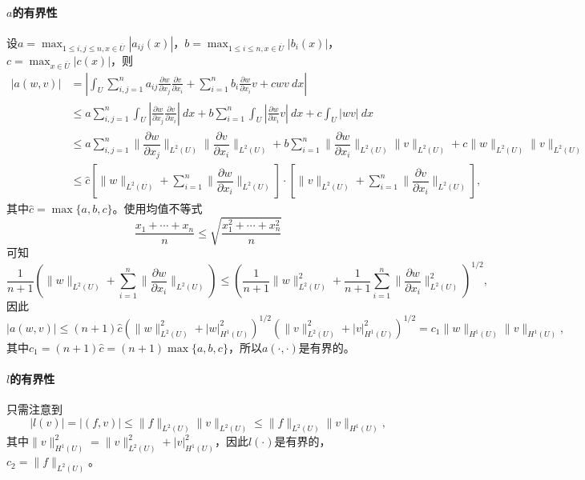 \documentclass[a4paper,10pt]{ctexart}
\begin{document}
\paragraph*{$ a $的有界性}
设$ a = \max_{1\leqslant i,j\leqslant n,x\in \overline{U}} |a_{ij}(x)| $，$ b = \max_{1\leqslant i\leqslant n,x\in \overline{U}} |b_i(x)| $，$ c = \max_{x\in \overline{U}} |c(x)| $，则
\[
    \begin{aligned}
        |a(w,v) |
        &= \left| \int_U \sum_{i,j=1}^n a_{ij}\frac{\partial w}{\partial x_j}\frac{\partial v}{\partial x_i} + \sum_{i=1}^n b_i\frac{\partial w}{\partial x_i}v + cwv\ d x \right|\\
        &\leqslant a \sum_{i,j=1}^n \int_U \left|\frac{\partial w}{\partial x_j}\frac{\partial v}{\partial x_i} \right|\ dx + b \sum_{i=1}^n \int_U \left| \frac{\partial w}{\partial x_i}v \right|\ dx + c \int_U \left| wv \right|\ dx\\
        &\leqslant a \sum_{i,j=1}^n \| \dfrac{\partial w}{\partial x_j} \|_{L^2(U)} \| \dfrac{\partial v}{\partial x_i} \|_{L^2(U)}  + b \sum_{i=1}^n \| \dfrac{\partial w}{\partial x_i} \|_{L^2(U)}\| v \|_{L^2(U)} + c\| w \| _{L^2(U)} \| v \|_{L^2(U)}\\
        &\leqslant \hat{c} \left[ \| w \|_{L^2(U)} + \sum_{i=1}^n \| \dfrac{\partial w}{\partial x_i} \|_{L^2(U)} \right] \cdot \left[ \| v \|_{L^2(U)} + \sum_{i=1}^n \| \dfrac{\partial v}{\partial x_i} \|_{L^2(U)} \right],
    \end{aligned}
\]
其中$ \hat{c} = \max\{a,b,c\} $。使用均值不等式
\[
    \frac{x_1+\cdots +x_n}{n}\leqslant \sqrt{\frac{x_1^2+\cdots +x_n^2}{n}} 
\]
可知
\[
    \frac{1}{n+1}\left( \| w \|_{L^2(U)} + \sum_{i=1}^n \| \dfrac{\partial w}{\partial x_i} \|_{L^2(U)} \right) \leqslant \left(\frac{1}{n+1} \| w \|^2_{L^2(U)} + \frac{1}{n+1}\sum_{i=1}^n \| \dfrac{\partial w}{\partial x_i} \|^2_{L^2(U)} \right)^{1/2},
\]
因此
\[
    |a(w,v)| \leqslant (n+1)\hat{c} (\| w \|^2_{L^2(U)}+|w|^2_{H^1(U)})^{1 / 2} (\| v \|^2_{L^2(U)}+|v|^2_{H^1(U)})^{1 / 2} = c_1\| w \|_{H^1(U)}\| v \|_{H^1(U)},
\]
其中$ c_1 = (n+1)\hat{c} = (n+1)\max\{a,b,c\} $，所以$ a(\cdot,\cdot) $是有界的。

\paragraph*{$ l $的有界性}
只需注意到
\[
    |l(v)| = |(f,v)| \leqslant \| f \|_{L^2(U)}\| v \|_{L^2(U)} \leqslant \| f \|_{L^2(U)}\| v \|_{H^1(U)},
\]
其中$ \| v \|_{H^1(U)}^2 = \| v \|_{L^2(U)}^2+|v|_{H^1(U)}^2 $，因此$ l(\cdot) $是有界的，$ c_2 = \| f \|_{L^2(U)} $。
\end{document}
